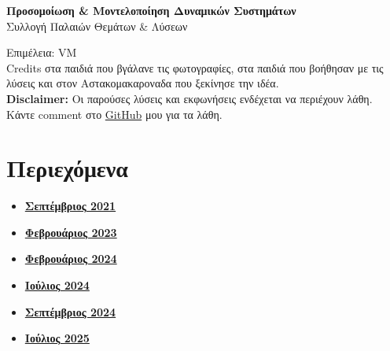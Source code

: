 \documentclass[a4paper,11pt]{article}
\begin{document}
\thispagestyle{empty}
\begin{center}
    \vspace*{3cm}
    {\Huge \textbf{Προσομοίωση \& Μοντελοποίηση Δυναμικών Συστημάτων}}\\[1em]
    {\Large Συλλογή Παλαιών Θεμάτων \& Λύσεων}\\[3em]
\end{center}

\vfill
\begin{center}
{\small Επιμέλεια: VM}\\[1em]
{\small Credits στα παιδιά που βγάλανε τις φωτογραφίες, στα παιδιά που βοήθησαν με τις λύσεις και στον Αστακομακαροναδα που ξεκίνησε την ιδέα.}\\[1em]
{\footnotesize \textbf{Disclaimer:} Οι παρούσες λύσεις και εκφωνήσεις ενδέχεται να περιέχουν λάθη. Κάντε comment στο \href{https://github.com/Garidomakaronada/Simulation}{GitHub} μου για τα λάθη.}
\end{center}

\newpage

\section*{Περιεχόμενα}

\begin{itemize}
    \item[\hyperlink{exam1}{\textbf{1.}}] \hyperlink{exam1}{\textbf{Σεπτέμβριος 2021}}
    \item[\hyperlink{exam2}{\textbf{2.}}] \hyperlink{exam2}{\textbf{Φεβρουάριος 2023}}
    \item[\hyperlink{exam3}{\textbf{3.}}] \hyperlink{exam3}{\textbf{Φεβρουάριος 2024}}
    \item[\hyperlink{exam4}{\textbf{4.}}] \hyperlink{exam4}{\textbf{Ιούλιος 2024}}
    \item[\hyperlink{exam5}{\textbf{5.}}] \hyperlink{exam5}{\textbf{Σεπτέμβριος 2024}}
    \item[\hyperlink{exam6}{\textbf{6.}}] \hyperlink{exam6}{\textbf{Ιούλιος 2025}}
\end{itemize}

\newpage
\end{document}
